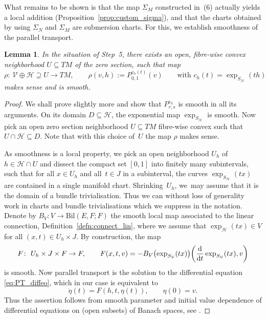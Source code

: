 \documentclass[11pt]{article}
\numberwithin{equation}{section}
\numberwithin{equation}{section}
\newtheorem{Lemma}[Theorem]{Lemma}
\newcommand{\cH}{\ensuremath{\mathcal{H}}}
\newcommand{\cV}{\ensuremath{\mathcal{V}}}
\begin{document}
What remains to be shown is that the map $\Sigma_{M}$ constructed in~(6) actually yields a local addition (Proposition~\ref{prop:custom_sigma}), and that the charts obtained by using $\Sigma_{N}$ and $\Sigma_{M}$ are submersion charts.
For this, we establish smoothness of the parallel transport.

\begin{Lemma}\label{lem:smooth_aux}
In the situation of Step~{\rm 5}, there exists an open, fibre-wise convex neighborhood ${U \subseteq TM}$ of the zero section, such that map
\begin{displaymath}
\rho \colon \ \cV \oplus \cH \supseteq U \rightarrow TM, \qquad \rho (v,h) := P_{0,1}^{c_h(t)}(v) \qquad \text{with } c_h (t) = \exp_{S_{\cH}} (th)
\end{displaymath}
makes sense and is smooth.
\end{Lemma}

\begin{proof}
 We shall prove slightly more and show that $P_{r,s}^{c_h}$ is smooth in all its arguments.
On its domain $D\subseteq \cH$, the exponential map $\exp_{S_{\cH}}$ is smooth. Now pick an open zero section neighborhood $U\subseteq TM$ fibre-wise convex such that $U \cap \cH \subseteq D$. Note that with this choice of~$U$ the map $\rho$ makes sense.

As smoothness is a local property, we pick an open neighborhood $U_h$ of $h \in \cH \cap U$ and dissect the compact set $[0,1]$ into finitely many subintervals, such that for all $x\in U_h$ and all~${t \in J}$ in a subinterval, the curves $\exp_{S_\cH}(tx)$ are contained in a single manifold chart. Shrinking~${U_h}$, we~may assume that it is the domain of a bundle trivialisation. Thus we can without loss of generality work in charts and bundle trivialisations which we suppress in the notation. Denote by $B_V \colon V \rightarrow \text{Bil}(E , F; F)$ the smooth local map associated to the linear connection, Definition~\ref{defn:connect_lin}, where we assume that $\exp_\cH (tx)\in V$ for all $(x,t) \in U_h\times J$. By construction, the map
\begin{displaymath}F \colon\ U_h \times J \times F \rightarrow F, \qquad F(x,t,v) =- B_V\bigl(\exp_{S_{\cV}}(tx)\bigr)\biggl(\frac{{\rm d}}{{\rm d}t}\exp_{S_{\cV}}(tx),v\biggr)
\end{displaymath}
is smooth. Now parallel transport is the solution to the differential equation \eqref{eq:PT_diffeo}, which in our case is equivalent to
\begin{displaymath}
 \dot{\eta}(t) = F(h,t,\eta(t)), \qquad \eta(0)=v.
\end{displaymath}
Thus the assertion follows from smooth parameter and initial value dependence of differential equations on (open subsets) of Banach spaces, see \cite[Chapter~IV, Section~1]{La01}.
\end{proof}
\end{document}
